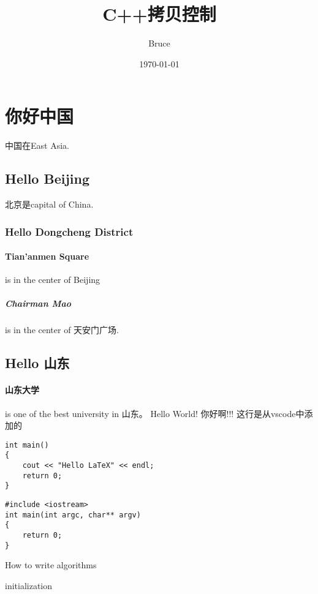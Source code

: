 \documentclass[UTF8]{ctexart}
\title{C++拷贝控制}
\author{Bruce}
\date{\today}
\begin{document}
\maketitle
\tableofcontents

\section{你好中国}
中国在East Asia.
\subsection{Hello Beijing}
北京是capital of China.
\subsubsection{Hello Dongcheng District}
\paragraph{Tian'anmen Square}
is in the center of Beijing
\subparagraph{Chairman Mao}
is in the center of 天安门广场.
\subsection{Hello 山东}
\paragraph{山东大学} is one of the best university in 山东。\newline
Hello World! 你好啊!!!
这行是从vscode中添加的


\begin{verbatim}
int main()
{
    cout << "Hello LaTeX" << endl;
    return 0;
}
\end{verbatim}

\begin{lstlisting}[caption= hello world]
#include <iostream>
int main(int argc, char** argv)
{
    return 0;
}
\end{lstlisting}



\begin{algorithm}[H]
\caption{How to write algorithms}
initialization\;

\end{algorithm}
\end{document}
